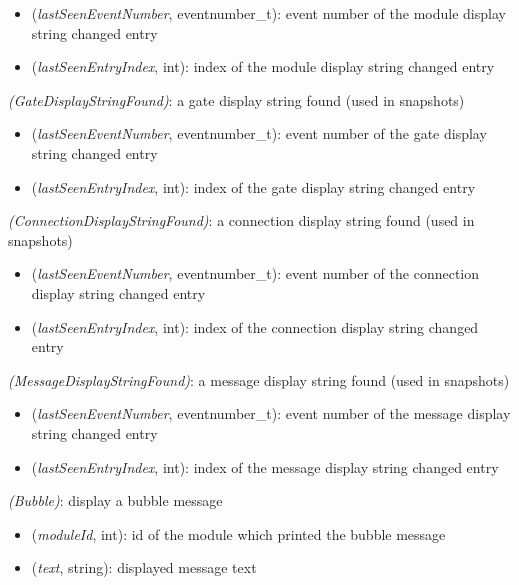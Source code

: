 \begin{itemize}
  \item \tbf{\#} (\textit{lastSeenEventNumber}, eventnumber\_t): event number of the module display string changed entry
  \item {} (\textit{lastSeenEntryIndex}, int): index of the module display string changed entry
\end{itemize}

 \textit{(GateDisplayStringFound)}: a gate display string found (used in snapshots)

\begin{itemize}
  \item \tbf{\#} (\textit{lastSeenEventNumber}, eventnumber\_t): event number of the gate display string changed entry
  \item {} (\textit{lastSeenEntryIndex}, int): index of the gate display string changed entry
\end{itemize}

 \textit{(ConnectionDisplayStringFound)}: a connection display string found (used in snapshots)

\begin{itemize}
  \item \tbf{\#} (\textit{lastSeenEventNumber}, eventnumber\_t): event number of the connection display string changed entry
  \item {} (\textit{lastSeenEntryIndex}, int): index of the connection display string changed entry
\end{itemize}

 \textit{(MessageDisplayStringFound)}: a message display string found (used in snapshots)

\begin{itemize}
  \item \tbf{\#} (\textit{lastSeenEventNumber}, eventnumber\_t): event number of the message display string changed entry
  \item {} (\textit{lastSeenEntryIndex}, int): index of the message display string changed entry
\end{itemize}

 \textit{(Bubble)}: display a bubble message

\begin{itemize}
  \item {} (\textit{moduleId}, int): id of the module which printed the bubble message
  \item {} (\textit{text}, string): displayed message text
\end{itemize}


